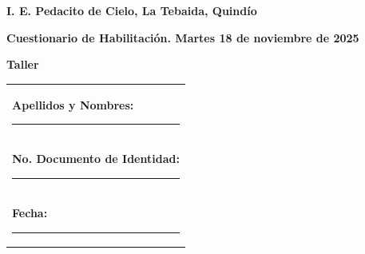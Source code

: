 \documentclass[10pt,a4paper]{article}
\makeatletter
\newcommand{\myID}{\@ID}
\makeatother
\begin{document}
\thispagestyle{empty}
{\sf
\textbf{\LARGE{I. E. Pedacito de Cielo, La Tebaida, Quindío}}

\textbf{\large{Cuestionario de Habilitación. Martes 18 de noviembre de 2025}}

\textbf{\large{Taller \myID}}

\vspace*{2cm}

\begin{tabular}{p{14cm}}
\textbf{Apellidos y Nombres:} \hrule \\[1.5cm]
\textbf{No. Documento de Identidad:} \hrule \\[1.5cm]
\textbf{Fecha:} \hrule  \\[1.5cm]
\end{tabular}

\vspace*{1cm}

}
\newpage

\begin{enumerate}


\end{enumerate}
\end{document}
